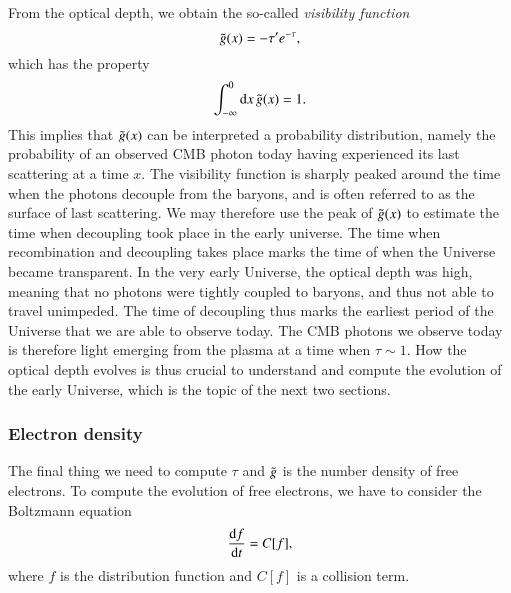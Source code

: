 From the optical depth, we obtain the so-called \textit{visibility function} \cite[Eq. (8)]{callin} 
\begin{equation} \label{eq:M2:theory:g_tilde_of_x_definition}
    \tilde{g}(x) = -\tau' e^{-\tau},
\end{equation}
which has the property 
\begin{equation} \label{eq:M2:theory:g_tilde_normalization}
    \int_{-\infty}^0\dd x\,\tilde{g}(x) = 1.
\end{equation}
This implies that $\tilde{g}(x)$ can be interpreted a probability distribution, namely the probability of an observed CMB photon today having experienced its last scattering at a time $x$. The visibility function is sharply peaked around the time when the photons decouple from the baryons, and is often referred to as the surface of last scattering. We may therefore use the peak of $\tilde{g}(x)$ to estimate the time when decoupling took place in the early universe. The time when recombination and decoupling takes place marks the time of when the Universe became transparent. In the very early Universe, the optical depth was high, meaning that no photons were tightly coupled to baryons, and thus not able to travel unimpeded. The time of decoupling thus marks the earliest period of the Universe that we are able to observe today. The CMB photons we observe today is therefore light emerging from the plasma at a time when $\tau\sim1$. How the optical depth evolves is thus crucial to understand and compute the evolution of the early Universe, which is the topic of the next two sections.   

\subsubsection{Electron density} \label{sssec:M2_electron_density}
The final thing we need to compute $\tau$ and $\tilde{g}$ is the number density of free electrons. To compute the evolution of free electrons, we have to consider the Boltzmann equation \citep[Eq. (3.19)]{Dodelson}
\begin{equation} \label{eq:M2:theory:Boltzmann_equation}
    \dv{f}{t} = C[f],
\end{equation}
where $f$ is the distribution function and $C[f]$ is a collision term. 

